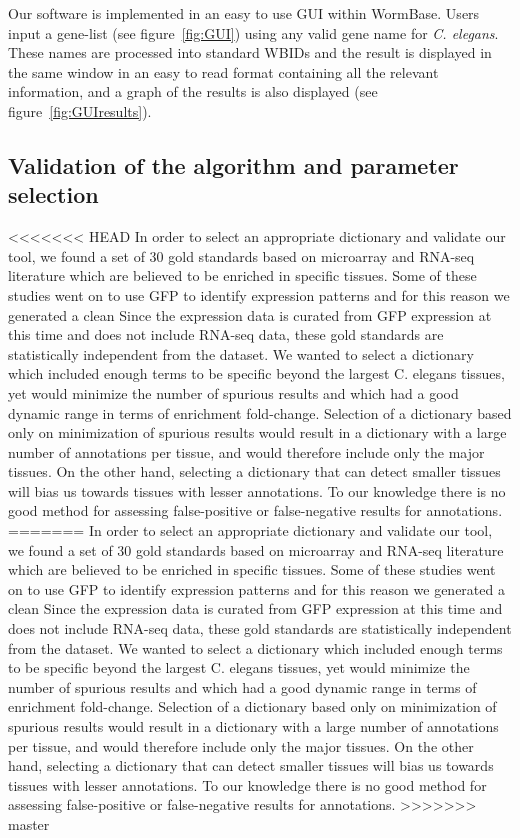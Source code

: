 \documentclass[linenumbers, doublespacing]{bmcart}
\begin{document}
	Our software is implemented in an easy to use GUI within WormBase. Users input a gene-list (see figure~\ref{fig:GUI}) using any valid gene name for \emph{C. elegans}. These names are processed into standard WBIDs and the result is displayed in the same window in an easy to read format containing all the relevant information, and a graph of the results is also displayed (see figure~\ref{fig:GUIresults}).
	
\subsection*{Validation of the algorithm and parameter selection}
<<<<<<< HEAD
	In order to select an appropriate dictionary and validate our tool, we found a set of 30 gold standards based on microarray and RNA-seq literature which are believed to be enriched in specific tissues\cite{}. Some of these studies went on to use GFP to identify expression patterns and for this reason we generated a clean Since the expression data is curated from GFP expression at this time and does not include RNA-seq data, these gold standards are statistically independent from the dataset. We wanted to select a dictionary which included enough terms to be specific beyond the largest C. elegans tissues, yet would minimize the number of spurious results and which had a good dynamic range in terms of enrichment fold-change. Selection of a dictionary based only on minimization of spurious results would result in a dictionary with a large number of annotations per tissue, and would therefore include only the major tissues. On the other hand, selecting a dictionary that can detect smaller tissues will bias us towards tissues with lesser annotations. To our knowledge there is no good method for assessing false-positive or false-negative results for annotations. 
=======
	In order to select an appropriate dictionary and validate our tool, we found a set of 30 gold standards based on microarray and RNA-seq literature which are believed to be enriched in specific tissues\cite{Gaudet2004, Spencer2011, Cinar2005, Watson2008a, Pauli2006, Portman2004, Fox2007, Smith2010}. Some of these studies went on to use GFP to identify expression patterns and for this reason we generated a clean Since the expression data is curated from GFP expression at this time and does not include RNA-seq data, these gold standards are statistically independent from the dataset. We wanted to select a dictionary which included enough terms to be specific beyond the largest C. elegans tissues, yet would minimize the number of spurious results and which had a good dynamic range in terms of enrichment fold-change. Selection of a dictionary based only on minimization of spurious results would result in a dictionary with a large number of annotations per tissue, and would therefore include only the major tissues. On the other hand, selecting a dictionary that can detect smaller tissues will bias us towards tissues with lesser annotations. To our knowledge there is no good method for assessing false-positive or false-negative results for annotations. 
>>>>>>> master
	
\end{document}

